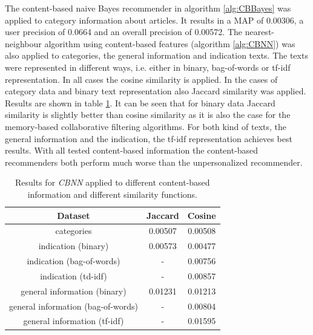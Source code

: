 \documentclass[10pt]{reportMaster}
\begin{document}
The content-based naive Bayes recommender in algorithm \ref{alg:CBBayes} was applied to category information about articles.
It results in a MAP of 0.00306, a user precision of 0.0664 and an overall precision of 0.00572.
The nearest-neighbour algorithm using content-based features (algorithm \ref{alg:CBNN}) was also applied to categories, the general information and indication texts.
The texts were represented in different ways, i.e. either in binary, bag-of-words or tf-idf representation.
In all cases the cosine similarity is applied.
In the cases of category data and binary text representation also Jaccard similarity was applied. 
Results are shown in table \ref{tab:CBNN}.
It can be seen that for binary data Jaccard similarity is slightly better than cosine similarity as it is also the case for the memory-based collaborative filtering algorithms.
For both kind of texts, the general information and the indication, the tf-idf representation achieves best results.
With all tested content-based information the content-based recommenders both perform much worse than the unpersonalized recommender.

\begin{table}
\begin{tabular}{|c||c|c|}
	\hline
	\textbf{Dataset}&\textbf{Jaccard}&\textbf{Cosine}\\ \hline
	categories&0.00507&0.00508\\ \hline
	indication (binary)&0.00573&0.00477\\ \hline	
	indication (bag-of-words)&-&0.00756\\ \hline	
	indication (td-idf)&-&0.00857\\ \hline	
	general information (binary)&0.01231&0.01213\\ \hline	
	general information (bag-of-words)&-&0.00804\\ \hline	
	general information (tf-idf)&-&0.01595\\ \hline	
	\end{tabular}
	\caption{Results for \textit{CBNN} applied to different content-based information and different similarity functions.}	
	\label{tab:CBNN}
\end{table}

\end{document}
